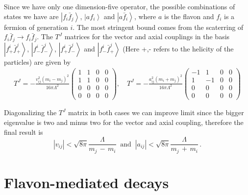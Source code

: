 \documentclass[prd,amsfonts,onecolumn,superscriptaddress,aps,nofootinbib,11pt]{revtex4-1}
\begin{document}
Since we have only one dimension-five operator, the possible combinations of states we have are 
$\left|f_i \bar{f}_j\right\rangle$, $\left|a f_i\right\rangle$ and $\left|a \bar{f}_i\right\rangle$, where $a$ is the flavon and $f_i$ is a fermion of generation $i$. The most stringent bound comes from the scaterring of $f_i \bar{f}_j \rightarrow f_i \bar{f}_j$. The $T^J$ matrices for the vector and axial couplings in the basis $\left|f^i_+ \bar{f}^j_+\right\rangle$, $\left|f^i_- \bar{f}^j_-\right\rangle$, $\left|f^i_+ \bar{f}^j_-\right\rangle$ and $\left|f^i_- \bar{f}^j_+\right\rangle$ (Here +,- refers to the helicity of the particles) are given by
\begin{eqnarray}
T^J = -\frac{v_{ij}^2\left(m_i - m_j\right)^2}{16\pi\Lambda^2}
    \begin{pmatrix}
     1 & 1 & 0 & 0\\   
     1 & 1 & 0 & 0 \\
     0 & 0 & 0 & 0\\
     0 & 0 & 0 & 0
    \end{pmatrix}, \quad
T^J = -\frac{a_{ij}^2\left(m_i + m_j\right)^2}{16\pi\Lambda^2}
    \begin{pmatrix}
     -1 & 1 & 0 & 0\\   
     1 & -1 & 0 & 0 \\
     0 & 0 & 0 & 0\\
     0 & 0 & 0 & 0
    \end{pmatrix}
\end{eqnarray}

\indent Diagonalizing the $T^J$ matrix in both cases we can improve limit since the bigger eigenvalue is two and minus two for the vector and axial coupling, therefore the final result is
\begin{equation}
  \left|v_{ij} \right| < \sqrt{8\pi}\frac{\Lambda}{m_j\,-\,m_i} \;\;\mbox{and}\;\; \left|a_{ij} \right| <\sqrt{8\pi}\frac{\Lambda}{m_j\,+\,m_i}\, .
\end{equation}


\section{Flavon-mediated decays}
\label{app:decay}
\end{document}
